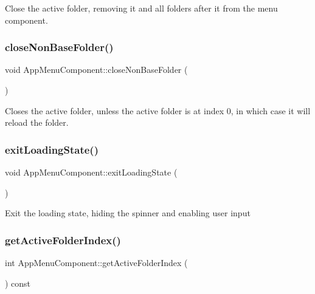 Close the active folder, removing it and all folders after it from the menu component. \mbox{\label{classAppMenuComponent_a7de278fbb7a5e3a0986fe2311d54b72f}} 
\subsubsection{\texorpdfstring{close\+Non\+Base\+Folder()}{closeNonBaseFolder()}}
{\footnotesize\ttfamily void App\+Menu\+Component\+::close\+Non\+Base\+Folder (\begin{DoxyParamCaption}{ }\end{DoxyParamCaption})\hspace{0.3cm}{\ttfamily [protected]}}

Closes the active folder, unless the active folder is at index 0, in which case it will reload the folder. \mbox{\label{classAppMenuComponent_a6dec3cfe6fd266e720cc66ab3d0191b7}} 
\subsubsection{\texorpdfstring{exit\+Loading\+State()}{exitLoadingState()}}
{\footnotesize\ttfamily void App\+Menu\+Component\+::exit\+Loading\+State (\begin{DoxyParamCaption}{ }\end{DoxyParamCaption})}

Exit the loading state, hiding the spinner and enabling user input \mbox{\label{classAppMenuComponent_a2200f8d6fa8179d064531b338c20254b}} 
\subsubsection{\texorpdfstring{get\+Active\+Folder\+Index()}{getActiveFolderIndex()}}
{\footnotesize\ttfamily int App\+Menu\+Component\+::get\+Active\+Folder\+Index (\begin{DoxyParamCaption}{ }\end{DoxyParamCaption}) const\hspace{0.3cm}{\ttfamily [protected]}}

